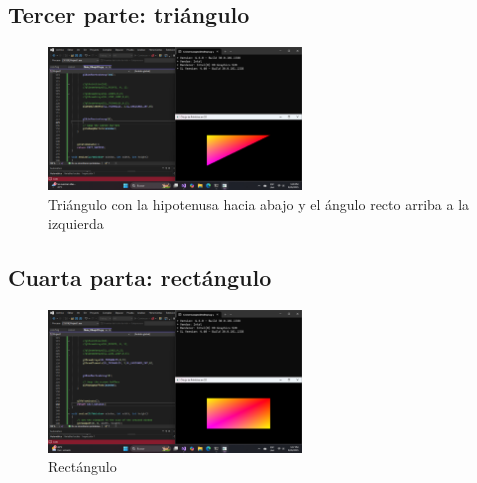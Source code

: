 \documentclass[a4paper,11pt]{article}                 %
\begin{document}
\subsection{Tercer parte: triángulo}
\begin{figure}[H] %
    \centering %
    \includegraphics[width=0.6\textwidth]{images/triangle.png} %
    \caption{Triángulo con la hipotenusa hacia abajo y el ángulo recto arriba a la izquierda} %
    \label{fig:triangle} %
\end{figure}
\subsection{Cuarta parta: rectángulo}
\begin{figure}[H] %
    \centering %
    \includegraphics[width=0.6\textwidth]{images/square.png} %
    \caption{Rectángulo} %
    \label{fig:square} %
\end{figure}
\end{document}
